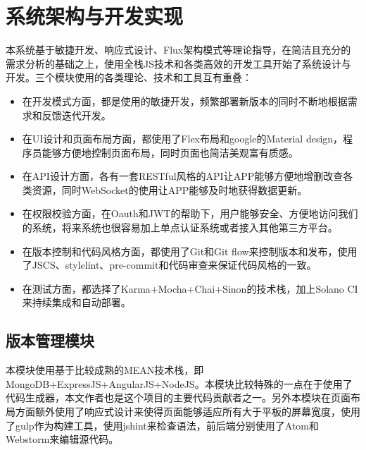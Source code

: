 
\chapter{系统架构与开发实现}
\label{chap:design_and_implement}
本系统基于敏捷开发、响应式设计、Flux架构模式等理论指导，在简洁且充分的需求分析的基础之上，使用全栈JS技术和各类高效的开发工具开始了系统设计与开发。三个模块使用的各类理论、技术和工具互有重叠：
\begin{itemize}
  \item 在开发模式方面，都是使用的敏捷开发，频繁部署新版本的同时不断地根据需求和反馈迭代开发。
  \item 在UI设计和页面布局方面，都使用了Flex布局和google的Material design，程序员能够方便地控制页面布局，同时页面也简洁美观富有质感。
  \item 在API设计方面，各有一套RESTful风格的API让APP能够方便地增删改查各类资源，同时WebSocket的使用让APP能够及时地获得数据更新。
  \item 在权限校验方面，在Oauth和JWT的帮助下，用户能够安全、方便地访问我们的系统，将来系统也很容易加上单点认证系统或者接入其他第三方平台。
  \item 在版本控制和代码风格方面，都使用了Git和Git flow来控制版本和发布，使用了JSCS、stylelint、pre-commit和代码审查来保证代码风格的一致。
  \item 在测试方面，都选择了Karma+Mocha+Chai+Sinon的技术栈，加上Solano CI来持续集成和自动部署。
\end{itemize}
\section{版本管理模块}
本模块使用基于比较成熟的MEAN技术栈，即MongoDB+ExpressJS+AngularJS+NodeJS。本模块比较特殊的一点在于使用了代码生成器，本文作者也是这个项目的主要代码贡献者之一。另外本模块在页面布局方面额外使用了响应式设计来使得页面能够适应所有大于平板的屏幕宽度，使用了gulp作为构建工具，使用jshint来检查语法，前后端分别使用了Atom和Webstorm来编辑源代码。
